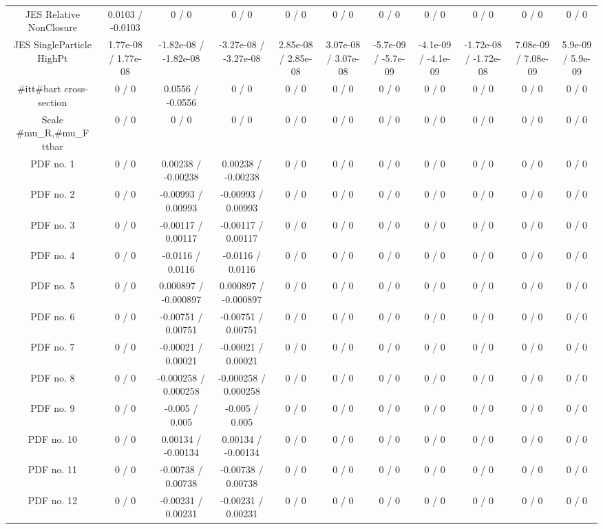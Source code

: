 \begin{table}[htbp]
\begin{center}
\begin{tabular}{|c|c|c|c|c|c|c|c|c|c|c|}
  JES Relative NonClosure & 0.0103 / -0.0103 & 0 / 0 & 0 / 0 & 0 / 0 & 0 / 0 & 0 / 0 & 0 / 0 & 0 / 0 & 0 / 0 & 0 / 0 \\ 
  JES SingleParticle HighPt & 1.77e-08 / 1.77e-08 & -1.82e-08 / -1.82e-08 & -3.27e-08 / -3.27e-08 & 2.85e-08 / 2.85e-08 & 3.07e-08 / 3.07e-08 & -5.7e-09 / -5.7e-09 & -4.1e-09 / -4.1e-09 & -1.72e-08 / -1.72e-08 & 7.08e-09 / 7.08e-09 & 5.9e-09 / 5.9e-09 \\ 
  #it{t#bar{t}} cross-section & 0 / 0 & 0.0556 / -0.0556 & 0 / 0 & 0 / 0 & 0 / 0 & 0 / 0 & 0 / 0 & 0 / 0 & 0 / 0 & 0 / 0 \\ 
  Scale #mu_{R},#mu_{F} ttbar & 0 / 0 & 0 / 0 & 0 / 0 & 0 / 0 & 0 / 0 & 0 / 0 & 0 / 0 & 0 / 0 & 0 / 0 & 0 / 0 \\ 
  PDF no. 1 & 0 / 0 & 0.00238 / -0.00238 & 0.00238 / -0.00238 & 0 / 0 & 0 / 0 & 0 / 0 & 0 / 0 & 0 / 0 & 0 / 0 & 0 / 0 \\ 
  PDF no. 2 & 0 / 0 & -0.00993 / 0.00993 & -0.00993 / 0.00993 & 0 / 0 & 0 / 0 & 0 / 0 & 0 / 0 & 0 / 0 & 0 / 0 & 0 / 0 \\ 
  PDF no. 3 & 0 / 0 & -0.00117 / 0.00117 & -0.00117 / 0.00117 & 0 / 0 & 0 / 0 & 0 / 0 & 0 / 0 & 0 / 0 & 0 / 0 & 0 / 0 \\ 
  PDF no. 4 & 0 / 0 & -0.0116 / 0.0116 & -0.0116 / 0.0116 & 0 / 0 & 0 / 0 & 0 / 0 & 0 / 0 & 0 / 0 & 0 / 0 & 0 / 0 \\ 
  PDF no. 5 & 0 / 0 & 0.000897 / -0.000897 & 0.000897 / -0.000897 & 0 / 0 & 0 / 0 & 0 / 0 & 0 / 0 & 0 / 0 & 0 / 0 & 0 / 0 \\ 
  PDF no. 6 & 0 / 0 & -0.00751 / 0.00751 & -0.00751 / 0.00751 & 0 / 0 & 0 / 0 & 0 / 0 & 0 / 0 & 0 / 0 & 0 / 0 & 0 / 0 \\ 
  PDF no. 7 & 0 / 0 & -0.00021 / 0.00021 & -0.00021 / 0.00021 & 0 / 0 & 0 / 0 & 0 / 0 & 0 / 0 & 0 / 0 & 0 / 0 & 0 / 0 \\ 
  PDF no. 8 & 0 / 0 & -0.000258 / 0.000258 & -0.000258 / 0.000258 & 0 / 0 & 0 / 0 & 0 / 0 & 0 / 0 & 0 / 0 & 0 / 0 & 0 / 0 \\ 
  PDF no. 9 & 0 / 0 & -0.005 / 0.005 & -0.005 / 0.005 & 0 / 0 & 0 / 0 & 0 / 0 & 0 / 0 & 0 / 0 & 0 / 0 & 0 / 0 \\ 
  PDF no. 10 & 0 / 0 & 0.00134 / -0.00134 & 0.00134 / -0.00134 & 0 / 0 & 0 / 0 & 0 / 0 & 0 / 0 & 0 / 0 & 0 / 0 & 0 / 0 \\ 
  PDF no. 11 & 0 / 0 & -0.00738 / 0.00738 & -0.00738 / 0.00738 & 0 / 0 & 0 / 0 & 0 / 0 & 0 / 0 & 0 / 0 & 0 / 0 & 0 / 0 \\ 
  PDF no. 12 & 0 / 0 & -0.00231 / 0.00231 & -0.00231 / 0.00231 & 0 / 0 & 0 / 0 & 0 / 0 & 0 / 0 & 0 / 0 & 0 / 0 & 0 / 0 \\ 

\end{tabular}
\end{center}
\end{table}
